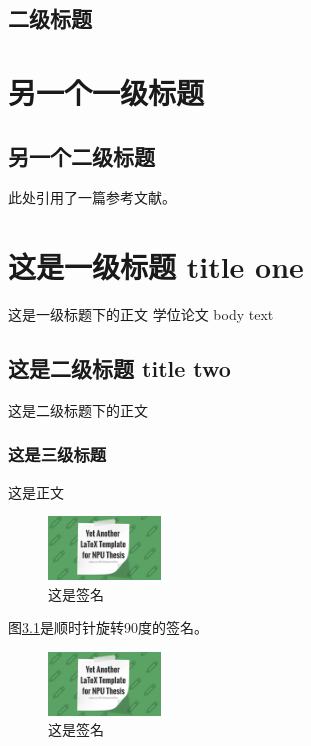 \documentclass[lang=chs,degree=master,blindreview=true,winfonts=true]{yanputhesis}
\begin{document}
\section{二级标题}
\label{sec:org046c7c6}
\chapter{另一个一级标题}
\label{sec:org04b5701}
\section{另一个二级标题}
\label{sec:org4863b40}

此处引用了一篇参考文献\cite{chen2014maiyuan}。

\chapter{这是一级标题 title one}
\label{sec:orgb9f5654}
这是一级标题下的正文 学位论文
body text
\section{这是二级标题 title two}
\label{sec:org13b6d4c}

这是二级标题下的正文

\subsection{这是三级标题}
\label{sec:orga19f8a3}

这是正文

\begin{figure}[htbp]
\centering
\includegraphics[angle=-90,width=3cm]{./poster.png}
\caption{\label{fig:zjm1}这是签名}
\end{figure}

图\ref{fig:zjm1}是顺时针旋转90度的签名。

\begin{figure}[htbp]
\centering
\includegraphics[angle=90,width=3cm]{./poster.png}
\caption{\label{fig:zjm}这是签名}
\end{figure}
\end{document}
